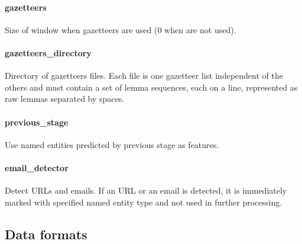 \paragraph{gazetteers}
Size of window when gazetteers are used (0 when are not used).

\paragraph{gazetteers\_directory}
Directory of gazetteers files. Each file is one gazetteer list independent
of the others and must contain a set of lemma sequences, each on a line,
represented as raw lemmas separated by spaces.

\paragraph{previous\_stage}
Use named entities predicted by previous stage as features.

\paragraph{email\_detector}
Detect URLs and emails. If an URL or an email is detected, it is immediately marked
with specified named entity type and not used in further processing.

\subsection{Data formats}

